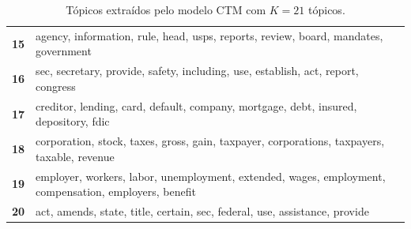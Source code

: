 \begin{table}[htpb]
\begin{tabularx}{\textwidth}{@{}l X@{}}
        \textbf{15} & agency, information, rule, head, usps, reports, review, board, mandates, government \\
        \textbf{16} & sec, secretary, provide, safety, including, use, establish, act, report, congress \\
        \textbf{17} & creditor, lending, card, default, company, mortgage, debt, insured, depository, fdic \\
        \textbf{18} & corporation, stock, taxes, gross, gain, taxpayer, corporations, taxpayers, taxable, revenue \\
        \textbf{19} & employer, workers, labor, unemployment, extended, wages, employment, compensation, employers, benefit \\
        \textbf{20} & act, amends, state, title, certain, sec, federal, use, assistance, provide \\
        \bottomrule
    \end{tabularx}
    \caption{Tópicos extraídos pelo modelo CTM com $K=21$ tópicos.}
    \label{tab:topicos_ctm_21}
\end{table}
